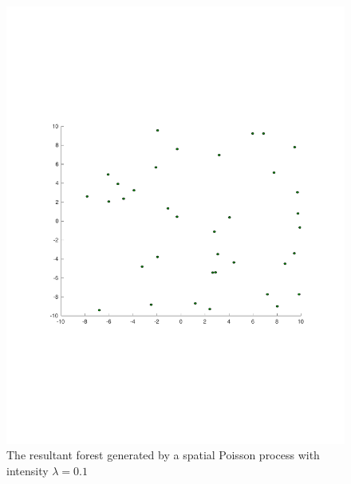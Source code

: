 \begin{figure}
  \centering
  \begin{minipage}[b]{0.4\textwidth}
    \includegraphics[width=\textwidth]{figures/experiments/poisson009}
    \caption{The resultant forest generated by a spatial Poisson process with
      intensity \(\lambda = 0.1\)}
    \label{fig:poisson009}
  \end{minipage}
  \begin{minipage}[b]{0.4\textwidth}

\end{minipage}
\end{figure}
